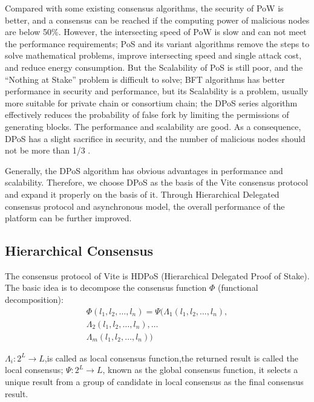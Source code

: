 \documentclass[UTF8,nofonts]{article}
\begin{document}
\begin{multicols}{2}
Compared with some existing consensus algorithms, the security of PoW is better, and a consensus can be reached if the computing power of malicious nodes are below 50\%. However, the intersecting speed of PoW is slow and can not meet the performance requirements; PoS and its variant algorithms remove the steps to solve mathematical problems, improve intersecting speed and single attack cost, and reduce energy consumption. But the Scalability of PoS is still poor, and the “Nothing at Stake” problem \cite{problems} is difficult to solve; BFT algorithms has better performance in security and performance, but its Scalability is a problem, usually more suitable for private chain or consortium chain; the DPoS \cite{dpos} series algorithm effectively reduces the probability of false fork by limiting the permissions of generating blocks. The performance and scalability are good. As a consequence, DPoS has a slight sacrifice in security, and the number of malicious nodes should not be more than 1/3 \cite{dpos2}.

Generally, the DPoS algorithm has obvious advantages in performance and scalability. Therefore, we choose DPoS as the basis of the Vite consensus protocol and expand it properly on the basis of it. Through Hierarchical Delegated consensus protocol and asynchronous model, the overall performance of the platform can be further improved.

\subsection{Hierarchical Consensus}
The consensus protocol of Vite is HDPoS (Hierarchical Delegated Proof of Stake). The basic idea is to decompose the consensus function $\Phi$ (functional decomposition):
\begin{equation}
\begin{split}
\Phi(l_1,l_2,\dots,l_n) = \Psi(\Lambda_1(l_1,l_2,\dots,l_n), \\
\Lambda_2(l_1,l_2,\dots,l_n),\dots \\
\Lambda_m(l_1,l_2,\dots,l_n))
\end{split}
\end{equation}

$\Lambda_i: 2^L \rightarrow L$,is called as local consensus function,the returned result is called the local consensus; $\Psi: 2^L \rightarrow L$, known as the global consensus function, it selects a unique result from a group of candidate in local consensus as the final consensus result.


\end{multicols}
\end{document}
